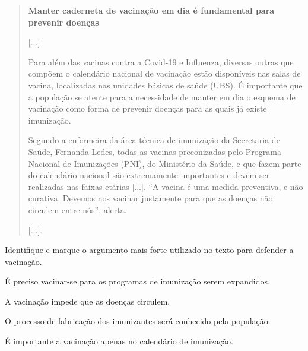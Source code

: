 \begin{quote}
\textbf{Manter caderneta de vacinação em dia é fundamental para prevenir
doenças}

{[}...{]}

Para além das vacinas contra a Covid-19 e Influenza, diversas outras que
compõem o calendário nacional de vacinação estão disponíveis nas salas
de vacina, localizadas nas unidades básicas de saúde (UBS). É importante
que a população se atente para a necessidade de manter em dia o esquema
de vacinação como forma de prevenir doenças para as quais já existe
imunização.

Segundo a enfermeira da área técnica de imunização da Secretaria de
Saúde, Fernanda Ledes, todas as vacinas preconizadas pelo Programa
Nacional de Imunizações (PNI), do Ministério da Saúde, e que fazem parte
do calendário nacional são extremamente importantes e devem ser
realizadas nas faixas etárias {[}...{]}. “A vacina é uma medida
preventiva, e não curativa. Devemos nos vacinar justamente para que as
doenças não circulem entre nós”, alerta.

{[}...{]}.

\end{quote}

Identifique e marque o argumento mais forte utilizado no texto para defender a
vacinação.

\begin{escolha}
\item É preciso vacinar-se para os programas de imunização serem expandidos.

\item A vacinação impede que as doenças circulem.

\item O processo de fabricação dos imunizantes será conhecido pela população.

\item É importante a vacinação apenas no calendário de imunização.
\end{escolha}


